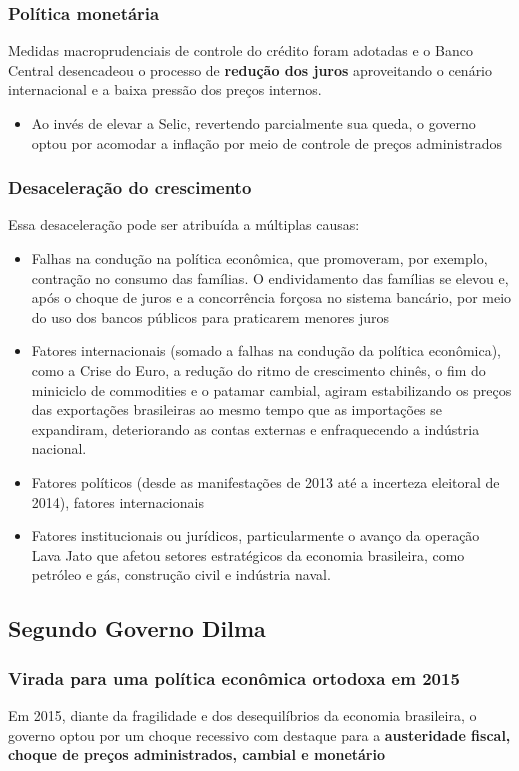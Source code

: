\documentclass[11pt]{article}
\begin{document}
\subsubsection*{Política monetária}
\label{sec:org102f65c}
Medidas macroprudenciais de controle do crédito foram adotadas e o Banco Central desencadeou o processo de \textbf{redução dos juros} aproveitando o cenário internacional e a baixa pressão dos preços internos.
\begin{itemize}
\item Ao invés de elevar a Selic, revertendo parcialmente sua queda, o governo optou por acomodar a inflação por meio de controle de preços administrados
\end{itemize}
\subsubsection*{Desaceleração do crescimento}
\label{sec:org2640d65}

Essa desaceleração pode ser atribuída a múltiplas causas:
\begin{itemize}
\item Falhas na condução na política econômica, que promoveram, por exemplo, contração no consumo das famílias. O endividamento das famílias se elevou e, após o choque de juros e a concorrência forçosa no sistema bancário, por meio do uso dos bancos públicos para praticarem menores juros
\item Fatores internacionais (somado a falhas na condução da política econômica), como a Crise do Euro, a redução do ritmo de crescimento chinês, o fim do miniciclo de commodities e o patamar cambial, agiram estabilizando os preços das exportações brasileiras ao mesmo tempo que as importações se expandiram, deteriorando as contas externas e enfraquecendo a indústria nacional.
\item Fatores políticos (desde as manifestações de 2013 até a incerteza eleitoral de 2014), fatores internacionais
\item Fatores institucionais ou jurídicos, particularmente o avanço da operação Lava Jato que afetou setores estratégicos da economia brasileira, como petróleo e gás, construção civil e indústria naval.
\end{itemize}


\subsection*{Segundo Governo Dilma}
\label{sec:orge880418}
\subsubsection*{Virada para uma política econômica ortodoxa em 2015}
\label{sec:org9ccdaf7}
Em 2015, diante da fragilidade e dos desequilíbrios da economia brasileira, o governo optou por um choque recessivo com destaque para a \textbf{austeridade fiscal, choque de preços administrados, cambial e  monetário}
\end{document}
